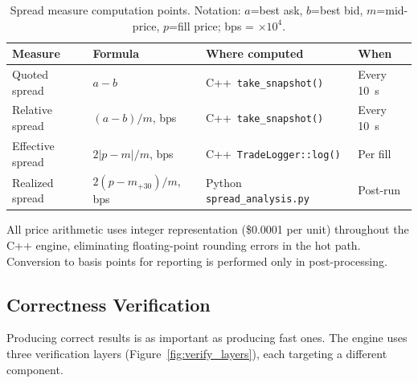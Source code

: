 \documentclass[12pt]{article}
\begin{document}
\begin{table}[H]
\centering
\small
\caption{Spread measure computation points.
  Notation: $a$=best ask, $b$=best bid, $m$=mid-price, $p$=fill price;
  bps = $\times 10^{4}$.}
\label{tab:spread_impl}
\begin{tabularx}{\textwidth}{@{}p{2.8cm}p{3.8cm}Xp{2.0cm}@{}}
\toprule
\textbf{Measure} & \textbf{Formula} & \textbf{Where computed} & \textbf{When} \\
\midrule
Quoted spread &
  $a - b$ &
  C++\ \texttt{take\_snapshot()} &
  Every 10~s \\[2pt]
Relative spread &
  $(a-b)/m$, bps &
  C++\ \texttt{take\_snapshot()} &
  Every 10~s \\[2pt]
Effective spread &
  $2|p-m|/m$, bps &
  C++\ \texttt{TradeLogger::log()} &
  Per fill \\[2pt]
Realized spread &
  $2(p-m_{+30})/m$, bps &
  Python \texttt{spread\_analysis.py} &
  Post-run \\
\bottomrule
\end{tabularx}
\end{table}

All price arithmetic uses integer representation (\$0.0001 per unit)
throughout the C++ engine, eliminating floating-point rounding errors
in the hot path. Conversion to basis points for reporting is performed
only in post-processing.

\subsection{Correctness Verification}

Producing correct results is as important as producing fast ones.
The engine uses three verification layers (Figure~\ref{fig:verify_layers}),
each targeting a different component.
\end{document}
